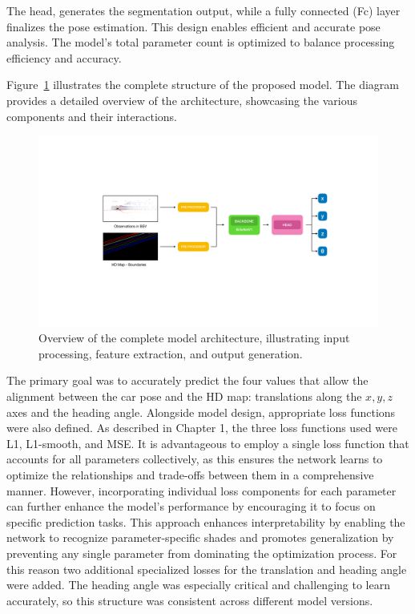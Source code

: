 The head, generates the segmentation output, while a fully connected (Fc) layer finalizes the pose estimation. This design enables efficient and accurate pose analysis. The model’s total parameter count is optimized to balance processing efficiency and accuracy.

Figure~\ref{fig:model1} illustrates the complete structure of the proposed model. The diagram provides a detailed overview of the architecture, showcasing the various components and their interactions. 
\begin{figure}[H]
    \centering
    \includegraphics[width=1\linewidth]{LateX//figs/architecture1.pdf}
    \caption{Overview of the complete model architecture, illustrating input processing, feature extraction, and output generation.}
    \label{fig:model1}
\end{figure}

The primary goal was to accurately predict the four values that allow the alignment between the car pose and the HD map: translations along the \( x, y, z \) axes and the heading angle. Alongside model design, appropriate loss functions were also defined. As described in Chapter 1, the three loss functions used were L1, L1-smooth, and MSE.
It is advantageous to employ a single loss function that accounts for all parameters collectively, as this ensures the network learns to optimize the relationships and trade-offs between them in a comprehensive manner. However, incorporating individual loss components for each parameter can further enhance the model's performance by encouraging it to focus on specific prediction tasks. This approach enhances interpretability by enabling the network to recognize parameter-specific shades and promotes generalization by preventing any single parameter from dominating the optimization process. For this reason two additional specialized losses for the translation and heading angle were added. 
The heading angle was especially critical and challenging to learn accurately, so this structure was consistent across different model versions.

